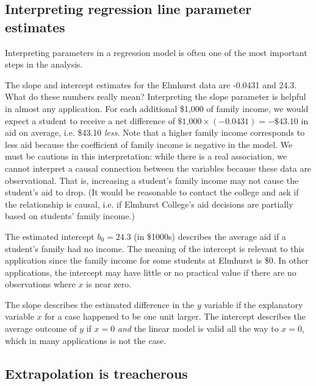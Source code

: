 \subsection{Interpreting regression line parameter estimates}


Interpreting parameters in a regression model is often one of the most important steps in the analysis.

\begin{example}{The slope and intercept estimates for the Elmhurst data are -0.0431 and 24.3. What do these numbers really mean?}
Interpreting the slope parameter is helpful in almost any application. For each additional \$1,000 of family income, we would expect a student to receive a net difference of $\$\text{1,000}\times (-0.0431) = -\$43.10$ in aid on average, i.e. \$43.10 \emph{less}. Note that a higher family income corresponds to less aid because the coefficient of family income is negative in the model. We must be cautious in this interpretation: while there is a real association, we cannot interpret a causal connection between the variables because these data are observational. That is, increasing a student's family income may not cause the student's aid to drop. (It would be reasonable to contact the college and ask if the relationship is causal, i.e. if Elmhurst College's aid decisions are partially based on students' family income.)

The estimated intercept $b_0=24.3$ (in \$1000s) describes the average aid if a student's family had no income. The meaning of the intercept is relevant to this application since the family income for some students at Elmhurst is \$0. In other applications, the intercept may have little or no practical value if there are no observations where $x$ is near zero.
\end{example}

\begin{termBox}{
The slope describes the estimated difference in the $y$ variable if the explanatory variable $x$ for a case happened to be one unit larger. The intercept describes the average outcome of $y$ if $x=0$ \emph{and} the linear model is valid all the way to $x=0$, which in many applications is not the case.}
\end{termBox}

\subsection{Extrapolation is treacherous}

